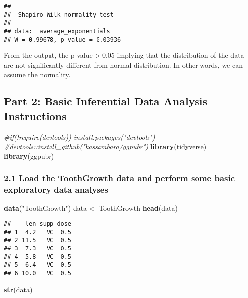\documentclass[]{article}
\newenvironment{Shaded}{\begin{snugshade}}{\end{snugshade}}
\newcommand{\KeywordTok}[1]{\textcolor[rgb]{0.13,0.29,0.53}{\textbf{#1}}}
\newcommand{\StringTok}[1]{\textcolor[rgb]{0.31,0.60,0.02}{#1}}
\newcommand{\CommentTok}[1]{\textcolor[rgb]{0.56,0.35,0.01}{\textit{#1}}}
\newcommand{\NormalTok}[1]{#1}
\begin{document}
\begin{verbatim}
## 
##  Shapiro-Wilk normality test
## 
## data:  average_exponentials
## W = 0.99678, p-value = 0.03936
\end{verbatim}

From the output, the p-value \textgreater{} 0.05 implying that the
distribution of the data are not significantly different from normal
distribution. In other words, we can assume the normality.

\subsection{Part 2: Basic Inferential Data Analysis
Instructions}\label{part-2-basic-inferential-data-analysis-instructions}

\begin{Shaded}
\begin{Highlighting}[]
\CommentTok{#if(!require(devtools)) install.packages("devtools")}
\CommentTok{#devtools::install_github("kassambara/ggpubr")}
\KeywordTok{library}\NormalTok{(tidyverse)}
\KeywordTok{library}\NormalTok{(ggpubr)}
\end{Highlighting}
\end{Shaded}

\subsubsection{2.1 Load the ToothGrowth data and perform some basic
exploratory data
analyses}\label{load-the-toothgrowth-data-and-perform-some-basic-exploratory-data-analyses}

\begin{Shaded}
\begin{Highlighting}[]
\KeywordTok{data}\NormalTok{(}\StringTok{"ToothGrowth"}\NormalTok{)}
\NormalTok{data <-}\StringTok{ }\NormalTok{ToothGrowth}
\KeywordTok{head}\NormalTok{(data)}
\end{Highlighting}
\end{Shaded}

\begin{verbatim}
##    len supp dose
## 1  4.2   VC  0.5
## 2 11.5   VC  0.5
## 3  7.3   VC  0.5
## 4  5.8   VC  0.5
## 5  6.4   VC  0.5
## 6 10.0   VC  0.5
\end{verbatim}

\begin{Shaded}
\begin{Highlighting}[]
\KeywordTok{str}\NormalTok{(data)}
\end{Highlighting}
\end{Shaded}
\end{document}
